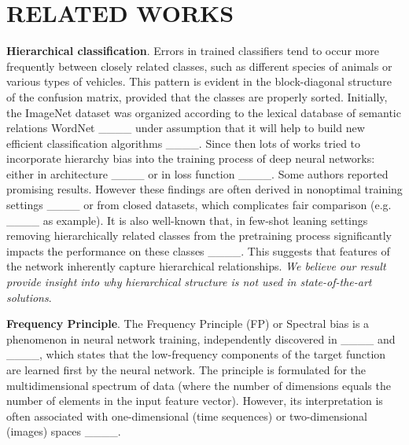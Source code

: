 \section{RELATED WORKS}
\textbf{Hierarchical classification}. Errors in trained classifiers tend to occur
more frequently between closely related classes, such as different species of
animals or various types of vehicles. This pattern is evident in the
block-diagonal structure of the confusion matrix, provided that the classes are
properly sorted. Initially, the ImageNet dataset was organized according to the
lexical database of semantic relations WordNet ____ under
assumption that it will help to build new efficient classification algorithms
____. Since then lots of works tried to incorporate
hierarchy bias into the training process of deep neural networks: either in
architecture ____ or in
loss function ____. Some authors
reported promising results. However these findings are often derived in
nonoptimal training settings ____ or from closed
datasets, which complicates fair comparison (e.g. ____
as example). It is also well-known that, in few-shot leaning settings removing
hierarchically related classes from the pretraining process significantly
impacts the performance on these classes ____. This
suggests that features of the network inherently capture hierarchical
relationships. \textit{We believe our result provide insight into why
  hierarchical structure is not used in state-of-the-art solutions}.

\textbf{Frequency Principle}. The Frequency Principle (FP) or Spectral bias is a
phenomenon in neural network training, independently discovered in
____ and ____, which states that the
low-frequency components of the target function are learned first by the neural
network. The principle is formulated for the multidimensional spectrum of data
(where the number of dimensions equals the number of elements in the input
feature vector). However, its interpretation is often associated with
one-dimensional (time sequences) or two-dimensional (images) spaces
____.

